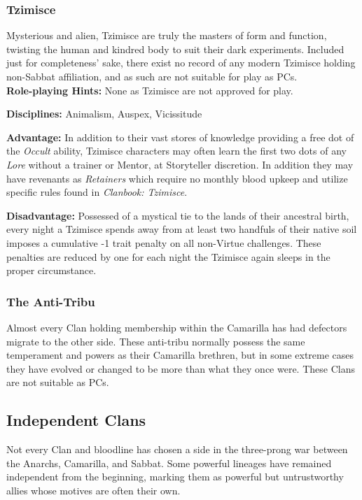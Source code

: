 \subsubsection{Tzimisce}
Mysterious and alien, Tzimisce are truly the masters of form and function, 
twisting the human and kindred body to suit their dark experiments.  Included 
just for completeness' sake, there exist no record of any modern Tzimisce 
holding non-Sabbat affiliation, and as such are not suitable for play as PCs. \\

\textbf{Role-playing Hints:}  None as Tzimisce are not approved for play.

\textbf{Disciplines:}  Animalism, Auspex, Vicissitude

\textbf{Advantage:}  In addition to their vast stores of knowledge providing a 
free dot of the \emph{Occult} ability, Tzimisce characters may often learn the 
first two dots of any \emph{Lore} without a trainer or Mentor, at Storyteller 
discretion.  In addition they may have revenants as \emph{Retainers} which require 
no monthly blood upkeep and utilize specific rules found in \emph{Clanbook: Tzimisce}.

\textbf{Disadvantage:}  Possessed of a mystical tie to the lands of their 
ancestral birth, every night a Tzimisce spends away from at least two handfuls 
of their native soil imposes a cumulative -1 trait penalty on all non-Virtue challenges.  
These penalties are reduced by one for each night the Tzimisce again sleeps in the 
proper circumstance.

\subsubsection{The Anti-Tribu}
Almost every Clan holding membership within the Camarilla has had defectors 
migrate to the other side.  These anti-tribu normally possess the same 
temperament and powers as their Camarilla brethren, but in some extreme cases 
they have evolved or changed to be more than what they once were.  These 
Clans are not suitable as PCs.

\subsection{Independent Clans}
Not every Clan and bloodline has chosen a side in the three-prong war between 
the Anarchs, Camarilla, and Sabbat.  Some powerful lineages have remained 
independent from the beginning, marking them as powerful but untrustworthy 
allies whose motives are often their own.


